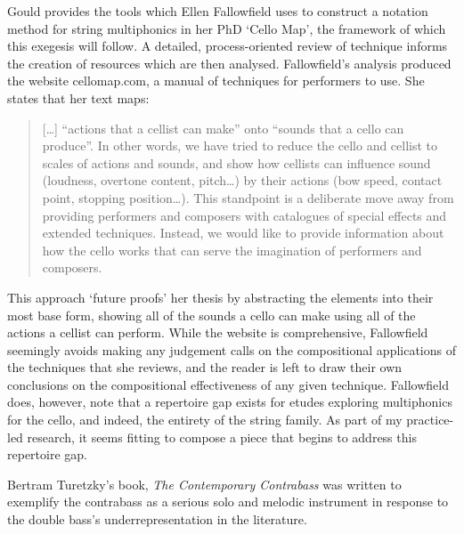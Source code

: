 Gould provides the tools which Ellen Fallowfield uses to construct a notation method for string multiphonics in her PhD ‘Cello Map’, the framework of which this exegesis will follow. 
A detailed, process-oriented review of technique informs the creation of resources which are then analysed.\autocite{fallowfieldCelloMapHandbook2009} 
Fallowfield’s analysis produced the website cellomap.com, a manual of techniques for performers to use. 
She states that her text maps:
\begin{quotation}
    [\ldots] “actions that a cellist can make” onto “sounds that a cello can produce”. 
    In other words, we have tried to reduce the cello and cellist to scales of actions and sounds, and show how cellists can influence sound (loudness, overtone content, pitch…) by their actions (bow speed, contact point, stopping position…). 
    This standpoint is a deliberate move away from providing performers and composers with catalogues of special effects and extended techniques. 
    Instead, we would like to provide information about how the cello works that can serve the imagination of performers and composers.\autocite{fallowfieldCelloMap}
\end{quotation}
This approach ‘future proofs’ her thesis by abstracting the elements into their most base form, showing all of the sounds a cello can make using all of the actions a cellist can perform. 
While the website is comprehensive, Fallowfield seemingly avoids making any judgement calls on the compositional applications of the techniques that she reviews, and the reader is left to draw their own conclusions on the compositional effectiveness of any given technique. 
Fallowfield does, however, note that a repertoire gap exists for etudes exploring multiphonics for the cello, and indeed, the entirety of the string family. 
As part of my practice-led research, it seems fitting to compose a piece that begins to address this repertoire gap.


Bertram Turetzky’s book, \emph{The Contemporary Contrabass} was written to exemplify the contrabass as a serious solo and melodic instrument in response to the double bass's underrepresentation in the literature.\autocite[]{turetzkyContemporaryContrabass1974}

